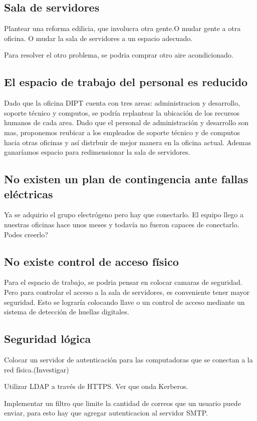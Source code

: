 \documentclass[a4paper,11pt,oneside]{article}
\begin{document}
\subsection*{Sala de servidores}
Plantear una reforma edilicia, que involucra otra gente.O mudar gente a otra oficina. O mudar la sala de servidores a un espacio adecuado.

Para resolver el otro problema, se podria comprar otro aire acondicionado.
\subsection*{El espacio de trabajo del personal es reducido}
Dado que la oficina DIPT cuenta con tres areas: administracion y desarrollo, soporte técnico y computos, se podría replantear la ubicación de los recursos humanos de cada area. Dado que el personal de administración y desarrollo son mas, proponemos reubicar a los empleados de soporte técnico y de computos hacia otras oficinas y así distrbuir de mejor manera en la oficina actual. Ademas ganaríamos espacio para redimensionar la sala de servidores.
\subsection*{No existen un plan de contingencia ante fallas eléctricas}
Ya se adquirio el grupo electrógeno pero hay que conectarlo. El equipo llego a nuestras oficinas hace unos meses y todavía no fueron capaces de conectarlo. Podes creerlo?
\subsection*{No existe control de acceso físico}
Para el espacio de trabajo, se podria pensar en colocar camaras de seguridad. Pero para controlar el acceso a la sala de servidores, es conveniente tener mayor seguridad. Esto se lograría colocando llave o un control de acceso mediante un sistema de detección de huellas digitales.
\subsection*{Seguridad lógica}
Colocar un servidor de autenticación para las computadoras que se conectan a la red física.(Investigar)

Utilizar LDAP a través de HTTPS. Ver que onda Kerberos.

Implementar un filtro que limite la cantidad de correos que un usuario puede enviar, para esto hay que agregar autenticacion al servidor SMTP.
\end{document}
